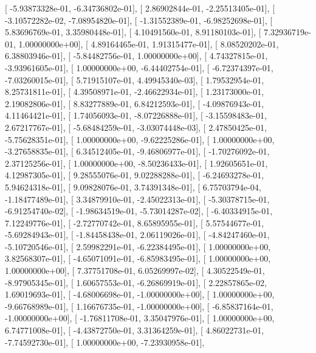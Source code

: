 \documentclass{article}
\begin{document}
       [ -5.93873328e-01,  -6.34736802e-01],
       [  2.86902844e-01,  -2.25513405e-01],
       [ -3.10572282e-02,  -7.08954820e-01],
       [ -1.31552389e-01,  -6.98252698e-01],
       [  5.83696769e-01,   3.35980448e-01],
       [  4.10491560e-01,   8.91180103e-01],
       [  7.32936719e-01,   1.00000000e+00],
       [  4.89164465e-01,   1.91315477e-01],
       [  8.08520202e-01,   6.38803946e-01],
       [ -5.84482756e-01,   1.00000000e+00],
       [  4.74327815e-01,  -3.93961605e-01],
       [  1.00000000e+00,  -6.44402754e-01],
       [ -6.72374397e-01,  -7.03260015e-01],
       [  5.71915107e-01,   4.49945340e-03],
       [  1.79532954e-01,   8.25731811e-01],
       [  4.39508971e-01,  -2.46622934e-01],
       [  1.23173000e-01,   2.19082806e-01],
       [  8.83277889e-01,   6.84212593e-01],
       [ -4.09876943e-01,   4.11464421e-01],
       [  1.74056093e-01,  -8.07226888e-01],
       [ -3.15598483e-01,   2.67217767e-01],
       [ -5.68484259e-01,  -3.03074448e-03],
       [  2.47850425e-01,  -5.75628351e-01],
       [  1.00000000e+00,  -9.62225286e-01],
       [  1.00000000e+00,  -3.27658835e-01],
       [  6.34512405e-01,  -9.46806977e-01],
       [ -1.70276092e-01,   2.37125256e-01],
       [  1.00000000e+00,  -8.50236433e-01],
       [  1.92605651e-01,   4.12987305e-01],
       [  9.28555076e-01,   9.02288288e-01],
       [ -6.24693278e-01,   5.94624318e-01],
       [  9.09828076e-01,   3.74391348e-01],
       [  6.75703794e-04,  -1.18477489e-01],
       [  3.34879910e-01,  -2.45022313e-01],
       [ -5.30378715e-01,  -6.91254740e-02],
       [ -1.98634519e-01,  -5.73014287e-02],
       [ -6.40334915e-01,   7.12249776e-01],
       [ -2.72770742e-01,   8.65895955e-01],
       [  5.57544677e-01,  -5.69284943e-01],
       [ -1.84458438e-01,   2.06119026e-01],
       [ -4.84247460e-01,  -5.10720546e-01],
       [  2.59982291e-01,  -6.22384495e-01],
       [  1.00000000e+00,   3.82568307e-01],
       [ -4.65071091e-01,  -6.85983495e-01],
       [  1.00000000e+00,   1.00000000e+00],
       [  7.37751708e-01,   6.05269997e-02],
       [  4.30522549e-01,  -8.97905345e-01],
       [  1.60657553e-01,  -6.26869919e-01],
       [  2.22857865e-02,   1.69019693e-01],
       [ -4.68006698e-01,  -1.00000000e+00],
       [  1.00000000e+00,  -9.66768989e-01],
       [  1.16676735e-01,  -1.00000000e+00],
       [ -6.85837164e-01,  -1.00000000e+00],
       [ -1.76811708e-01,   3.35047976e-01],
       [  1.00000000e+00,   6.74771008e-01],
       [ -4.43872750e-01,   3.31364259e-01],
       [  4.86022731e-01,  -7.74592730e-01],
       [  1.00000000e+00,  -7.23930958e-01],
\end{document}
